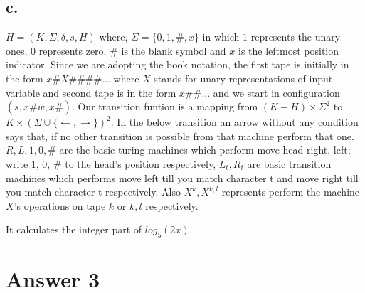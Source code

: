 \documentclass[12pt]{article}
\begin{document}
\subsection*{c.}
$H=(K, \Sigma, \delta, s, H)$ where, $\Sigma = \{0,1,\#,x\}$ in which $1$
represents the unary ones, $0$ represents zero, $\#$ is the blank symbol and 
$x$ is the leftmost position indicator. Since we are adopting the book notation, 
the first tape is initially in the form ${x\#X\#\#\#\#...}$ where $X$ stands for unary
representations of input variable and second tape is in the form ${x\#\#...}$
and we start in configuration ${(s, x\underline{\#}w, x\underline{\#})}$.
Our transition funtion is a mapping from $(K-H)\times \Sigma^2$ to 
$K\times (\Sigma \cup \{\leftarrow, \rightarrow \})^2$. In the below
transition an arrow without any condition says that, if no other transition
is possible from that machine perform that one. $R,L,1,0,\#$ are the
basic turing machines which perform move head right, left; write 1, 0, \#
to the head's position respectively, $L_t,R_t$ are basic transition machines
which performs move left till you match character t and move right till you
match character t respectively. Also $X^k, X^{k,l}$ represents perform the
machine $X$'s operations on tape $k$ or $k,l$ respectively.


It calculates the integer part of $log_5(2x)$.

\section*{Answer 3}
\end{document}
